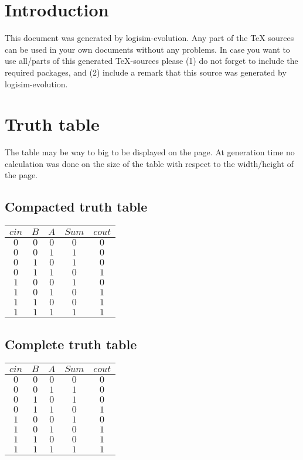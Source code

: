 \documentclass [15pt,a4paper,twoside]{article}
\begin{document}
\section{Introduction}
This document was generated by logisim-evolution. Any part of the TeX sources can be used in your own documents without any problems. In case you want to use all/parts of this generated TeX-sources please (1) do not forget to include the required packages, and (2) include a remark that this source was generated by logisim-evolution.
\section{Truth table}
The table may be way to big to be displayed on the page. At generation time no calculation was done on the size of the table with respect to the width/height of the page.
\subsection{Compacted truth table}
\begin{center}
\begin{tabular}{ccc|cc}
$cin$&$B$&$A$&$Sum$&$cout$\\
\hline
$0$&$0$&$0$&$0$&$0$\\
$0$&$0$&$1$&$1$&$0$\\
$0$&$1$&$0$&$1$&$0$\\
$0$&$1$&$1$&$0$&$1$\\
$1$&$0$&$0$&$1$&$0$\\
$1$&$0$&$1$&$0$&$1$\\
$1$&$1$&$0$&$0$&$1$\\
$1$&$1$&$1$&$1$&$1$\\

\end{tabular}
\end{center}
\subsection{Complete truth table}
\begin{center}
\begin{tabular}{ccc|cc}
$cin$&$B$&$A$&$Sum$&$cout$\\
\hline
$0$&$0$&$0$&$0$&$0$\\
$0$&$0$&$1$&$1$&$0$\\
$0$&$1$&$0$&$1$&$0$\\
$0$&$1$&$1$&$0$&$1$\\
$1$&$0$&$0$&$1$&$0$\\
$1$&$0$&$1$&$0$&$1$\\
$1$&$1$&$0$&$0$&$1$\\
$1$&$1$&$1$&$1$&$1$\\

\end{tabular}
\end{center}
\end{document}
